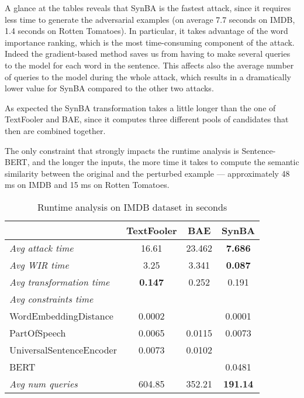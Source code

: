 A glance at the tables reveals that SynBA is the fastest attack, since it requires less time to generate the adversarial examples (on average 7.7 seconds on IMDB, 1.4 seconds on Rotten Tomatoes).
In particular, it takes advantage of the word importance ranking, which is the most time-consuming component of the attack. Indeed the gradient-based method saves us from having to make several queries to the model for each word in the sentence.
This affects also the average number of queries to the model during the whole attack, which results in a dramatically lower value for SynBA compared to the other two attacks.

As expected the SynBA transformation takes a little longer than the one of TextFooler and BAE, since it computes three different pools of candidates that then are combined together.

The only constraint that strongly impacts the runtime analysis is Sentence-BERT, and the longer the inputs, the more time it takes to compute the semantic similarity between the original and the perturbed example --- approximately 48 ms on IMDB and 15 ms on Rotten Tomatoes.

\begin{table}[h]
    \footnotesize
    \centering
    \begin{tabular}{|l|c|c|c|}
        \hline
        {} &            \textbf{TextFooler} &   \textbf{BAE} &    \textbf{SynBA} \\
        \hline \hline
        \emph{Avg attack time}           &      16.61 &     23.462 &     \textbf{7.686} \\
        \hline
        \emph{Avg WIR time}        &       3.25 &      3.341 &    \textbf{0.087} \\
        \hline
        \emph{Avg transformation time}      &      \textbf{0.147} &      0.252 &     0.191 \\
        \hline
        \emph{Avg constraints time}   &         &          &          \\      
        WordEmbeddingDistance        &  0.0002 &          &   0.0001 \\
        PartOfSpeech                 &  0.0065 &  0.0115  &   0.0073 \\
        UniversalSentenceEncoder     &  0.0073 &  0.0102  &          \\
        BERT                         &         &          &   0.0481 \\
        \hline
        \emph{Avg num queries}             &    604.85 &      352.21 &     \textbf{191.14} \\
        \hline
        \end{tabular}
    \caption{Runtime analysis on IMDB dataset in seconds}
    \label{tab:runtime-imdb}
\end{table}


